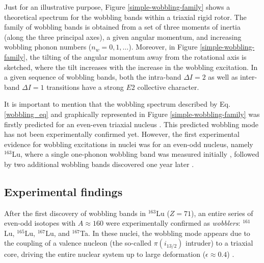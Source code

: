 \documentclass[11pt]{article}
\begin{document}
Just for an illustrative purpose, Figure \ref{simple-wobbling-family} shows a theoretical spectrum for the wobbling bands within a triaxial rigid rotor. The family of wobbling bands is obtained from a set of three moments of inertia (along the three principal axes), a given angular momentum, and increasing wobbling phonon numbers ($n_w=0,1,\dots$). Moreover, in Figure \ref{simple-wobbling-family}, the tilting of the angular momentum away from the rotational axis is sketched, where the tilt increases with the increase in the wobbling excitation. In a given sequence of wobbling bands, both the intra-band $\Delta I=2$ as well as inter-band $\Delta I=1$ transitions have a strong $E2$ collective character.

It is important to mention that the wobbling spectrum described by Eq. \ref{wobbling_eq} and graphically represented in Figure \ref{simple-wobbling-family} was firstly predicted for an even-even triaxial nucleus \cite{bohr1998nuclear}. This predicted wobbling mode has not been experimentally confirmed yet. However, the first experimental evidence for wobbling excitations in nuclei was for an even-odd nucleus, namely $^{163}$Lu, where a single one-phonon wobbling band was measured initially \cite{odegaard2001evidence}, followed by two additional wobbling bands discovered one year later \cite{jensen2002evidence,jensen2002wobbling}.

\subsection{Experimental findings}

After the first discovery of wobbling bands in $^{163}$Lu ($Z=71$), an entire series of even-odd isotopes with $A\approx160$ were experimentally confirmed as \emph{wobblers}: $^{161}$Lu, $^{165}$Lu, $^{167}$Lu, and $^{167}$Ta. In these nuclei, the wobbling mode appears due to the coupling of a valence nucleon (the so-called $\pi(i_{13/2})$ intruder) to a triaxial core, driving the entire nuclear system up to large deformation ($\epsilon\approx0.4$) \cite{schnack1995superdeformed}.
\end{document}
